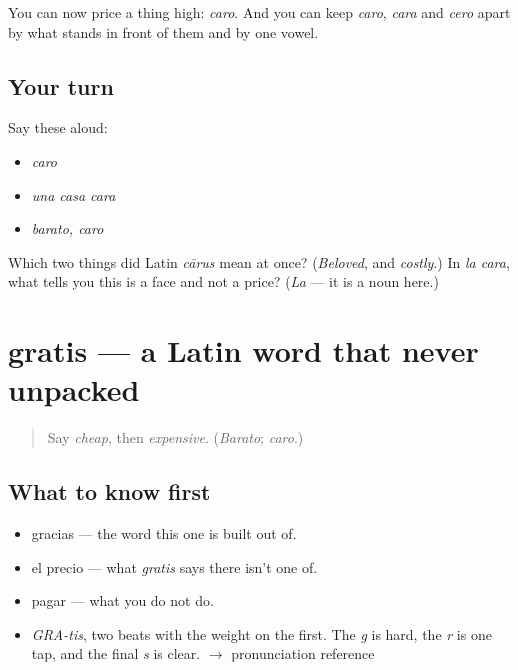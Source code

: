 \begin{grammarlens}[title={What you've built}]
You can now price a thing high: \emph{caro}. And you can keep \emph{caro}, \emph{cara} and \emph{cero} apart by what stands in front of them and by one vowel.
\end{grammarlens}

\subsection*{Your turn}
Say these aloud:

\begin{itemize}
\raggedright
  \item \emph{caro}
  \item \emph{una casa cara}
  \item \emph{barato, caro}
\end{itemize}

\begin{tcolorbox}[breakable,colback=teal!4,colframe=teal!35!black,title={Before you move on}]
Which two things did Latin \emph{cārus} mean at once? (\emph{Beloved}, and \emph{costly}.) In \emph{la cara}, what tells you this is a face and not a price? (\emph{La} — it is a noun here.)
\end{tcolorbox}
\section[gratis]{gratis — a Latin word that never unpacked}

\label{lesson:ES-C397-gratis}



\begin{quote}
Say \emph{cheap}, then \emph{expensive}. (\emph{Barato}; \emph{caro}.)
\end{quote}

\subsection*{What to know first}
\begin{itemize}
\raggedright
  \item gracias — the word this one is built out of.
  \item el precio — what \emph{gratis} says there isn't one of.
  \item pagar — what you do not do.
\end{itemize}

\begin{sounds}
\begin{itemize}
\raggedright
  \item \emph{GRA-tis}, two beats with the weight on the first. The \emph{g} is hard, the \emph{r} is one tap, and the final \emph{s} is clear. $\to$ pronunciation reference
\end{itemize}
\end{sounds}

